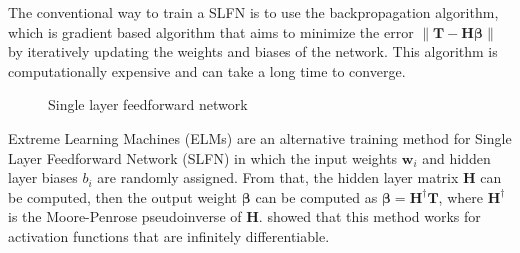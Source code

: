 The conventional way to train a SLFN is to use the backpropagation algorithm, which is gradient
based algorithm that aims to minimize the error $\left\lVert \textbf{T} - \textbf{H}\boldsymbol\beta \right\rVert$
by iteratively updating the weights and biases of the network. This algorithm is computationally
expensive and can take a long time to converge.

\begin{figure}[htpb]
    \caption{Single layer feedforward network}%
\end{figure}

Extreme Learning Machines (ELMs) are an alternative training method for Single
Layer Feedforward Network (SLFN) in which the input weights $\textbf{w}_i$ and
hidden layer biases $b_i$ are randomly assigned. From that, the hidden layer matrix $\textbf{H}$
can be computed, then the output weight $\boldsymbol\beta$ can be computed as $\boldsymbol\beta =
\textbf{H}^{\dagger} \textbf{T}$, where $\textbf{H}^{\dagger}$ is the Moore-Penrose pseudoinverse
of $\textbf{H}$.
\Textcite{huangExtremeLearningMachine2006} showed that
this method works for activation functions that are infinitely differentiable.

